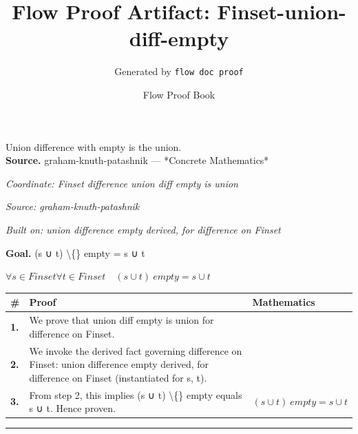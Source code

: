 \documentclass[11pt]{article}
\title{Flow Proof Artifact: Finset-union-diff-empty}
\author{Generated by \texttt{flow doc proof}}
\date{Flow Proof Book}
\theoremstyle{definition}
\begin{document}
\maketitle
Union difference with empty is the union.\\[0.5em]
\textbf{Source.} graham-knuth-patashnik — *Concrete Mathematics*\\[0.5em]
\bigskip
{}\par
\smallskip\noindent\textit{Coordinate: Finset \cdot difference \cdot union diff empty is union}\par
\smallskip\noindent\textit{Source: graham-knuth-patashnik}\par
\smallskip\noindent\textit{Built on: union difference empty derived, for difference on Finset}\par
\medskip
\noindent\textbf{Goal.} (s ∪ t) \textbackslash\{\} empty = s ∪ t\par
\noindent$\displaystyle \forall s \in Finset \forall t \in Finset\quad (s ∪ t) \ empty = s ∪ t$\par
\medskip
\noindent
\begin{tabular}{@{} >{\raggedright\arraybackslash}p{} >{\raggedright\arraybackslash}p{} >{\raggedleft\arraybackslash}p{} @{}}
\textbf{\#} & \textbf{Proof} & \textbf{Mathematics} \\
\midrule
\textbf{1.} & We prove that union diff empty is union for difference on Finset. & \\[0.45em]
\textbf{2.} & We invoke the derived fact governing difference on Finset: union difference empty derived, for difference on Finset (instantiated for s, t). & \\[0.45em]
\textbf{3.} & From step 2, this implies (s ∪ t) \textbackslash\{\} empty equals s ∪ t. Hence proven. & $\displaystyle (s ∪ t) \ empty = s ∪ t$ \\[0.45em]
\bottomrule
\end{tabular}
\label{thm:Finset-difference-union_diff_empty_is_union}
\par\medskip\hrule
\end{document}

